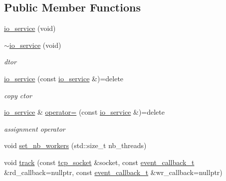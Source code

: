 \subsection*{Public Member Functions}
\begin{DoxyCompactItemize}
\item 
\hyperlink{classtacopie_1_1io__service_a4cd4a873cb4457cdc28bd2d00665d15a}{io\+\_\+service} (void)
\item 
\mbox{\label{classtacopie_1_1io__service_ae423d7e4b13f07fe41fb051345ffbf8d}} 
\hyperlink{classtacopie_1_1io__service_ae423d7e4b13f07fe41fb051345ffbf8d}{$\sim$io\+\_\+service} (void)
\begin{DoxyCompactList}\small\item\em dtor \end{DoxyCompactList}\item 
\mbox{\label{classtacopie_1_1io__service_ad5da7503d8fec083c6d28455ec9e21c7}} 
\hyperlink{classtacopie_1_1io__service_ad5da7503d8fec083c6d28455ec9e21c7}{io\+\_\+service} (const \hyperlink{classtacopie_1_1io__service}{io\+\_\+service} \&)=delete
\begin{DoxyCompactList}\small\item\em copy ctor \end{DoxyCompactList}\item 
\mbox{\label{classtacopie_1_1io__service_a980652008516b38357d405c16eda07fa}} 
\hyperlink{classtacopie_1_1io__service}{io\+\_\+service} \& \hyperlink{classtacopie_1_1io__service_a980652008516b38357d405c16eda07fa}{operator=} (const \hyperlink{classtacopie_1_1io__service}{io\+\_\+service} \&)=delete
\begin{DoxyCompactList}\small\item\em assignment operator \end{DoxyCompactList}\item 
void \hyperlink{classtacopie_1_1io__service_a7e2b0700c0a4591f86c344df8748b3a5}{set\+\_\+nb\+\_\+workers} (std\+::size\+\_\+t nb\+\_\+threads)
\item 
void \hyperlink{classtacopie_1_1io__service_a9f4c8bce3c0f6d660515b0b5eb109df8}{track} (const \hyperlink{classtacopie_1_1tcp__socket}{tcp\+\_\+socket} \&socket, const \hyperlink{classtacopie_1_1io__service_abb66850c32d9c724f4418d77bd04bcfd}{event\+\_\+callback\+\_\+t} \&rd\+\_\+callback=nullptr, const \hyperlink{classtacopie_1_1io__service_abb66850c32d9c724f4418d77bd04bcfd}{event\+\_\+callback\+\_\+t} \&wr\+\_\+callback=nullptr)

\end{DoxyCompactItemize}
